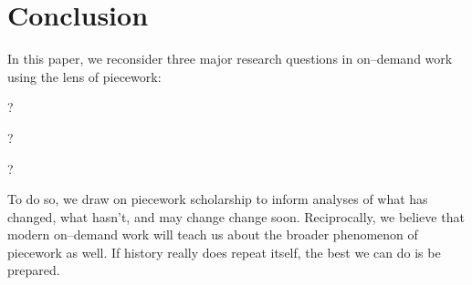 \documentclass[trackingWork]{subfiles}
\begin{document}
\section{Conclusion}
In this paper, we reconsider three major research questions in on--demand work using the lens of piecework:
\begin{inlinelist}
  \item {}?
  \item {}?
  \item {}?
\end{inlinelist}
To do so, we draw on piecework scholarship to inform analyses of what has changed, what hasn't, and may change change soon.
Reciprocally, we believe that modern on--demand work will teach us about the broader phenomenon of piecework as well.
If history really does repeat itself, the best we can do is be prepared.
\end{document}
